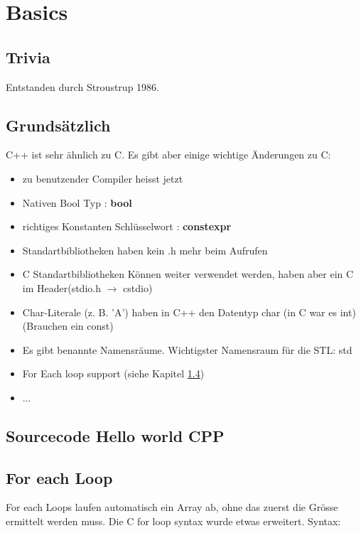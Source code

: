 \section{Basics}

\subsection{Trivia}

Entstanden durch Stroustrup 1986.

\subsection{Grundsätzlich}

C++ ist sehr ähnlich zu C. Es gibt aber einige wichtige Änderungen zu C:

\begin{itemize}[itemsep=1pt, parsep=0pt]
    \item zu benutzender Compiler heisst jetzt 
    \item Nativen Bool Typ : \textbf{bool}
    \item richtiges Konstanten Schlüsselwort : \textbf{constexpr}
    \item Standartbibliotheken haben kein .h mehr beim Aufrufen
    \item C Standartbibliotheken Können weiter verwendet werden, haben aber ein C im Header(stdio.h $\rightarrow$ cstdio)
    \item Char-Literale (z. B. 'A') haben in C++ den Datentyp char (in C war es int)(Brauchen ein const)
    \item Es gibt benannte Namensräume. Wichtigster Namensraum für die STL: std
    \item For Each loop support (siehe Kapitel \ref{forEach})
    \item ...
\end{itemize}

\subsection{Sourcecode Hello world CPP}



\subsection{For each Loop}\label{forEach}

For each Loops laufen automatisch ein Array ab, ohne das zuerst die Grösse ermittelt werden muss. 
Die C for loop syntax wurde etwas erweitert.
Syntax:

